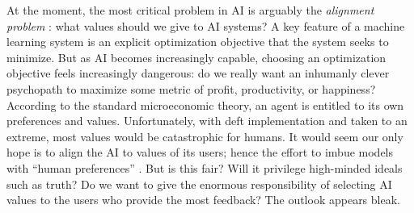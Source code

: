 At the moment, the most critical problem in
    AI is arguably the \emph{alignment problem}
\citep{wiener-alignment1960,alignment-zhuang-2020-NeurIPS,bostrom-superintelligence,christian2020alignment}:
what values should we give to AI systems? 
A key feature of a machine learning system is an explicit optimization objective that the system seeks to minimize. 
But as AI becomes increasingly capable, choosing an optimization objective 
    feels increasingly dangerous:
do we really want
an inhumanly clever psychopath to maximize some metric of profit, productivity, or happiness? 
According to the standard microeconomic theory, an agent is entitled to its own preferences and values.
Unfortunately, with deft implementation and taken to an extreme, most values would be catastrophic for humans. 
It would seem our only hope is to align the AI to values of its users;
    hence the effort to imbue models with 
    ``human preferences'' \citep{christiano2017deep}.
%
But is this fair? Will it privilege high-minded ideals such as truth? Do we want to give the enormous responsibility of
    selecting AI values 
    to the users who provide the most feedback?
The outlook appears bleak.

